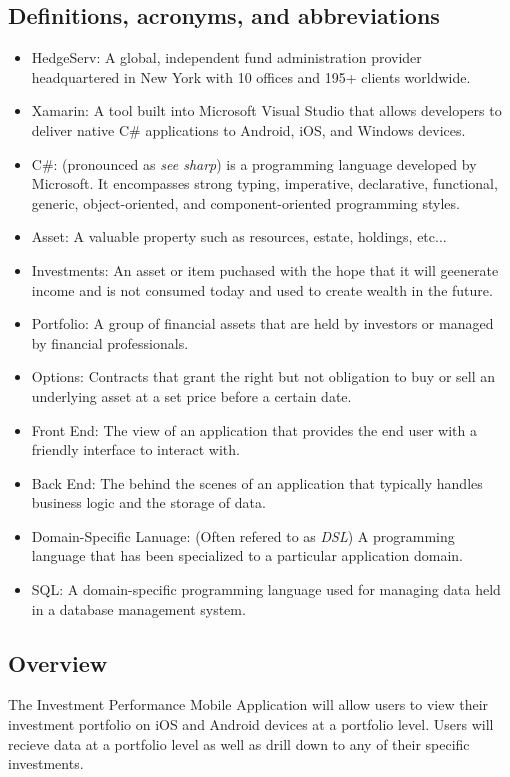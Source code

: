 \documentclass[onecolumn, draftclsnofoot,10pt, compsoc]{IEEEtran}
\begin{document}
\subsection{Definitions, acronyms, and abbreviations}
\begin{itemize}
	\item HedgeServ: A global, independent fund administration provider headquartered in New York with
		10 offices and 195+ clients worldwide.
	\item Xamarin: A tool built into Microsoft Visual Studio that allows developers to deliver native 
	   	C\# applications to Android, iOS, and Windows devices.
	\item C\#: (pronounced as \textit{see sharp}) is a programming language developed by Microsoft. It encompasses strong typing, imperative, declarative, functional, generic,
		object-oriented, and component-oriented programming styles.
	\item Asset: A valuable property such as resources, estate, holdings, etc...
	\item Investments: An asset or item puchased with the hope that it will geenerate income and is not consumed today and used to create wealth in the future.
	\item Portfolio: A group of financial assets that are held by investors or managed by financial professionals.
	\item Options: Contracts that grant the right but not obligation to buy or sell an underlying asset at a set price before a certain date.
	\item Front End: The view of an application that provides the end user with a friendly interface to interact with.
	\item Back End: The behind the scenes of an application that typically handles business logic and the storage of data.
	\item Domain-Specific Lanuage: (Often refered to as \textit{DSL}) A programming language that has been specialized to a particular application domain.
	\item SQL: A domain-specific programming language used for managing data held in a database management system.
\end{itemize}

\subsection{Overview}

The Investment Performance Mobile Application will allow users to view their investment portfolio on iOS and Android devices
at a portfolio level. Users will recieve data at a portfolio level as well as drill down to any of their specific investments.
\end{document}
